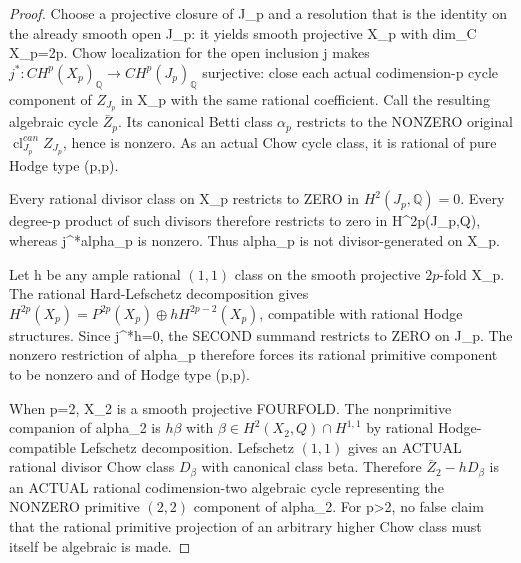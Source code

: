 \documentclass[11pt]{article}
\begin{document}
\begin{proof}
Choose a projective closure
of J_p and a resolution
that is the identity on the
already smooth open J_p:
it yields smooth projective
X_p with dim_C X_p=2p.
Chow localization for the
open inclusion j makes
$j^*:CH^p(X_p)_{\mathbb Q}
 \to CH^p(J_p)_{\mathbb Q}$
surjective: close each actual
codimension-p cycle component
of $Z_{J_p}$ in X_p with
the same rational coefficient.
Call the resulting algebraic
cycle $\bar Z_p$. Its canonical
Betti class $\alpha_p$ restricts
to the NONZERO original
$\operatorname{cl}_{J_p}^{can}
Z_{J_p}$, hence is nonzero.
As an actual Chow cycle class,
it is rational of pure
Hodge type (p,p).

Every rational divisor class
on X_p restricts to ZERO
in $H^2(J_p,\mathbb Q)=0$.
Every degree-p product of such
divisors therefore restricts
to zero in H^{2p}(J_p,Q),
whereas j^*alpha_p is nonzero.
Thus alpha_p is not
divisor-generated on X_p.

Let h be any ample rational
$(1,1)$ class on the smooth
projective $2p$-fold X_p.
The rational Hard-Lefschetz
decomposition gives
$H^{2p}(X_p)=
 P^{2p}(X_p)\oplus
 h H^{2p-2}(X_p)$,
compatible with rational
Hodge structures.
Since j^*h=0, the SECOND
summand restricts to ZERO
on J_p. The nonzero
restriction of alpha_p
therefore forces its
rational primitive component
to be nonzero and of Hodge
type (p,p).

When p=2, X_2 is a smooth
projective FOURFOLD.
The nonprimitive companion
of alpha_2 is $h\beta$
with $\beta\in H^2(X_2,Q)
\cap H^{1,1}$ by rational
Hodge-compatible Lefschetz
decomposition. Lefschetz
$(1,1)$ gives an ACTUAL
rational divisor Chow class
$D_\beta$ with canonical
class beta. Therefore
$\bar Z_2-hD_\beta$ is an
ACTUAL rational
codimension-two algebraic
cycle representing the
NONZERO primitive
$(2,2)$ component of alpha_2.
For p>2, no false claim
that the rational primitive
projection of an arbitrary
higher Chow class must
itself be algebraic is made.
\end{proof}
\end{document}

